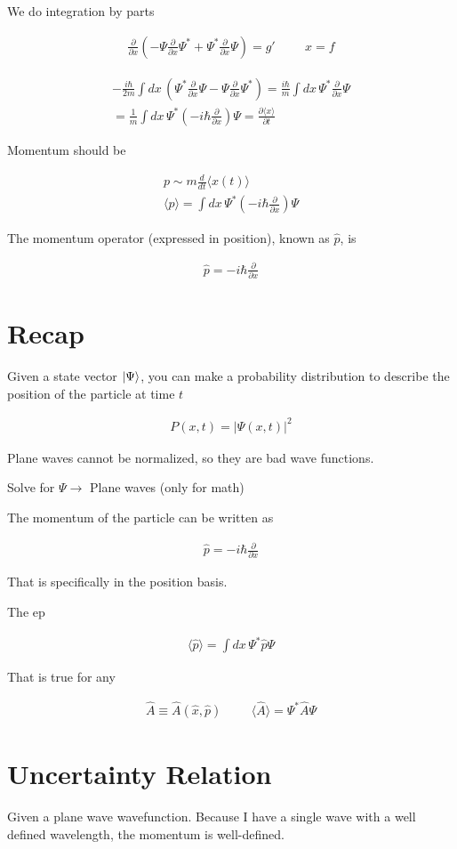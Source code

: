 \documentclass[fleqn]{report}
\newcommand{\hp}{\hspace{1cm}}
\newcommand{\del}{\partial}
\newcommand{\equations} [1] {
\begin{gather*}
#1
\end{gather*}
}
\begin{document}
We do integration by parts 

\equations{
    \frac{\del}{\del x}
    \left(
        - \Psi 
        \frac{\del}{\del x}
        \Psi^*
        +
        \Psi^*
        \frac{\del}{\del x}
        \Psi
    \right)
    =
    g'
    \hp 
    x = f 
}

\equations{
    - \frac{i \hbar }{2m}
    \int dx \,
    \left(
        \Psi^*
        \frac{\del}{\del x}\Psi 
        -
        \Psi 
        \frac{\del}{\del x}
        \Psi^*
    \right)
    =
    \frac{i \hbar}{m}
    \int dx \,
    \Psi^* \frac{\del}{\del x}
    \Psi
    \\
    =
    \frac{1}{m}
    \int dx \,
    \Psi^*
    \left(
        -i \hbar 
        \frac{\del}{\del x}
    \right)
    \Psi 
    =
    \frac{\del \langle x \rangle} {\del t}
}

Momentum should be 
\equations{
    p 
    \sim 
    m \frac{d}{dt}
    \langle x(t) \rangle
    \\
    \langle p \rangle 
    =
    \int dx \, 
    \Psi^*
    \left(
        -i \hbar \frac{\del}{\del x}
    \right)
    \Psi
}

The momentum operator (expressed in position), known as $\hat p$, is 
\equations{
    \hat p 
    =
    -i \hbar \frac{\del}{\del x}
}

\section{Recap}

Given a state vector $\ket{\Psi}$, you can make a probability distribution 
to describe the position of the particle at time $t$ 
\equations{
    P(x, t)
    =
    |\Psi(x, t)|^2
}

Plane waves cannot be normalized, so they are bad wave functions. 

Solve for $\Psi \rightarrow $ Plane waves (only for math)

The momentum of the particle can be written as 
\equations{
    \hat p 
    =
    - i \hbar 
    \frac{\del}{\del x}
}
That is specifically in the position basis. 

The ep
\equations{
    \langle \hat p \rangle 
    =
    \int dx \, 
    \Psi^* \hat p \Psi
}

That is true for any 
\equations{
    \hat A 
    \equiv
    \hat A(\hat x, \hat p)
    \hp
    \langle \hat A \rangle 
    =
    \Psi^* \hat A \Psi
}

\section{Uncertainty Relation}
Given a plane wave wavefunction. 
Because I have a single wave with a well defined wavelength, the momentum 
is well-defined. 
\end{document}
